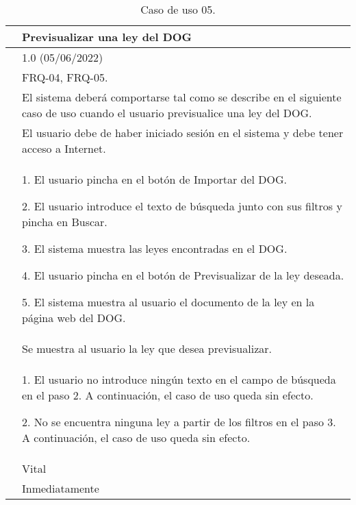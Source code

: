 \begin{table}[H]
\begin{center}
\begin{tabular}{|p{3cm}|p{10cm}|} \hline
\centering {\bf UC-05} & Previsualizar una ley del DOG  \\ \hline\hline
\centering {\bf Versión} & 1.0 (05/06/2022) \\ \hline
\centering {\bf Dependencias} &  FRQ-04, FRQ-05. \\ \hline
\centering {\bf Descripción} &  El sistema deberá comportarse tal como se describe en el siguiente caso de uso cuando el usuario previsualice una ley del DOG. \\ \hline
\centering {\bf Precondición} &  El usuario debe de haber iniciado sesión en el sistema y debe tener acceso a Internet. \\ \hline
\centering {\bf Secuencia normal} &  
1. El usuario pincha en el botón de Importar del DOG.

2. El usuario introduce el texto de búsqueda junto con sus filtros y pincha en Buscar.

3. El sistema muestra las leyes encontradas en el DOG.

4. El usuario pincha en el botón de Previsualizar de la ley deseada.

5. El sistema muestra al usuario el documento de la ley en la página web del DOG.
\\ \hline
\centering {\bf Postcondición} &  Se muestra al usuario la ley que desea previsualizar. \\ \hline
\centering {\bf Excepciones} & 
1. El usuario no introduce ningún texto en el campo de búsqueda en el paso 2. A continuación, el caso de uso queda sin efecto.

2. No se encuentra ninguna ley a partir de los filtros en el paso 3. A continuación, el caso de uso queda sin efecto.
\\ \hline
\centering {\bf Importancia} & Vital \\ \hline
\centering {\bf Urgencia} & Inmediatamente \\ \hline
\end{tabular}
\caption{Caso de uso 05.}
\label{enlaceUC5}
\end{center}
\end{table}

